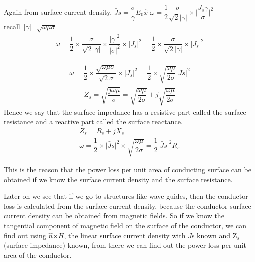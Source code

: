 Again from surface current density,
$\bar{J}s=\dfrac{\sigma}{\gamma}E_{0}\hat{x}$
$\omega=\dfrac{1}{2}\dfrac{\sigma}{\sqrt{2}\lvert\gamma\rvert}\times \lvert\dfrac{\bar{J}_{s}\gamma}{\sigma}\rvert^{2}$\\
recall\ $\lvert$$\gamma$$\rvert$=$\sqrt{\omega\mu\sigma}$
\begin{align}
\omega=\dfrac{1}{2}\times \dfrac{\sigma}{\sqrt{2}\lvert\gamma\rvert}\times \dfrac{\lvert\gamma\rvert^{2}}{\lvert\sigma\rvert^{2}}\times \lvert\bar{J}_{s}\rvert^{2}=\dfrac{1}{2}\times \dfrac{\sigma}{\sqrt{2}\lvert\gamma\rvert}\times \lvert\bar{J}_{s}\rvert^{2}
\end{align}

\begin{align}
\omega=\dfrac{1}{2}\times \dfrac{\sqrt{\omega\mu\sigma}}{\sqrt{2}\sigma}\times \lvert\bar{J}_{s}\rvert^{2}=\dfrac{1}{2}\times \sqrt{\dfrac{\omega\mu}{2\sigma}}\lvert\bar{J}s\rvert^{2}
\end{align}
\begin{align}
Z_{s}=\sqrt{\dfrac{j\omega\mu}{\sigma}}=\sqrt{\dfrac{\omega\mu}{2\sigma}}+j\sqrt{\dfrac{\omega\mu}{2\sigma}}
\end{align}
Hence we say that the surface impedance has a resistive part called the surface resistance and a reactive part called the surface reactance.
\begin{align}
Z_{s}=R_{s}+jX_{s}\\	
\omega=\dfrac{1}{2}\times \lvert\bar{J}s\rvert^{2}\times \sqrt{\dfrac{\omega\mu}{2\sigma}}=\dfrac{1}{2}\lvert\bar{J}s\rvert^{2}R_{s}
\end{align}

This is the reason that the power loss per unit area of conducting surface can be obtained if we know the surface current density and the surface resistance.

Later on we see that if we go to structures like wave guides, then the conductor loss is calculated from the surface current density, because the conductor surface current density can be obtained from magnetic fields. So if we know the tangential component of magnetic field on the surface of the conductor, we can find out using $\hat{n}$$\times $$\bar{H}$, the linear surface current density with $\bar{J}$s known and Z$_{s}$(surface impedance) known, from there we can find out the power loss per unit area of the conductor.

